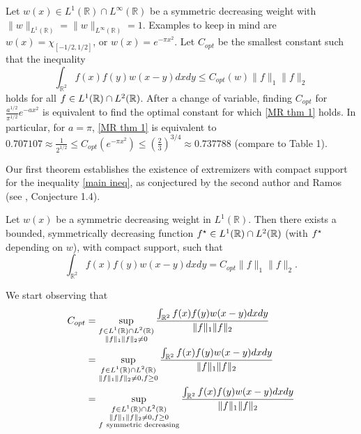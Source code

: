	
	Let $w(x) \in L^1(\mathbb{R})\cap L^{\infty}(\mathbb{R})$ be a symmetric decreasing weight with $\|w\|_{L^{1}(\mathbb R)} = \|w\|_{L^{\infty}(\mathbb R)} =1$. Examples to keep in mind are $w(x) = \chi_{[-1/2,1/2]}$, or $w(x) = e^{-\pi x^2}$. Let $C_{opt}$ be the smallest constant such that the inequality 
	\begin{equation}\label{main ineq}
			\int_{\mathbb R^2} f(x)f(y) w(x-y) dx dy \le C_{opt}(w) \|f\|_1\|f\|_2
		\end{equation}
	holds for all $f\in L^{1}({\mathbb R})\cap L^{2}({\mathbb R})$. After a change of variable, finding $C_{opt}$ for  $\frac{a^{1/2}}{\pi^{1/2}}e^{-a x^2}$ is equivalent to find the optimal constant for which \eqref{MR thm 1} holds. In particular, for $a=\pi$, \eqref{MR thm 1} is equivalent to $0.707107\approx  \frac{1}{2^{1/2}}\le C_{opt}(e^{-\pi x^2}) \le \left(\frac{2}{3}\right)^{3/4}\approx 0.737788$ (compare to Table 1).
	
	
Our first theorem establishes the existence of extremizers with compact support for the inequality \eqref{main ineq}, as conjectured by the second author and Ramos (see \cite{MR}, Conjecture 1.4). 

	\begin{thm}
	\label{thm:main}
		Let $w(x)$ be a symmetric decreasing weight in $L^1(\mathbb{R})$.  Then there exists a bounded, symmetrically decreasing function $f^\star \in L^{1}({\mathbb R})\cap L^{2}({\mathbb R})$ (with $f^\star$ depending on $w$), with compact support, such that
		\begin{equation}
			\int_{\mathbb R^2} f(x)f(y) w(x-y) dx dy = C_{opt}\|f\|_1\|f\|_2.
		\end{equation}
		



	\end{thm}

	We start observing that 
	\begin{align*}
	C_{opt}
	&=
		\sup_{\substack{f\in L^{1}(\R)\cap L^{2}(\R) \\ 
						\|f\|_1\|f\|_2\neq0}}
		\frac{\int_{\mathbb R^2} f(x)f(y)w(x-y) dx dy }
			 {\|f\|_1\|f\|_2}
	\\&=
		\sup_{\substack{f\in L^{1}(\R)\cap L^{2}(\R) \\ 
						\|f\|_1\|f\|_2\neq0 ,f\geq0}}
		\frac{\int_{\mathbb R^2} f(x)f(y)w(x-y) dx dy }
			 {\|f\|_1\|f\|_2}
	\\&= 	
		\sup_{\substack{f\in L^{1}(\R)\cap L^{2}(\R) \\ 
						\|f\|_1\|f\|_2\neq0 ,f\geq0\\ f \ \text{symmetric decreasing}}}
		\frac{\int_{\mathbb R^2} f(x)f(y)w(x-y) dx dy }
			 {\|f\|_1\|f\|_2}\\
	\end{align*}
	
